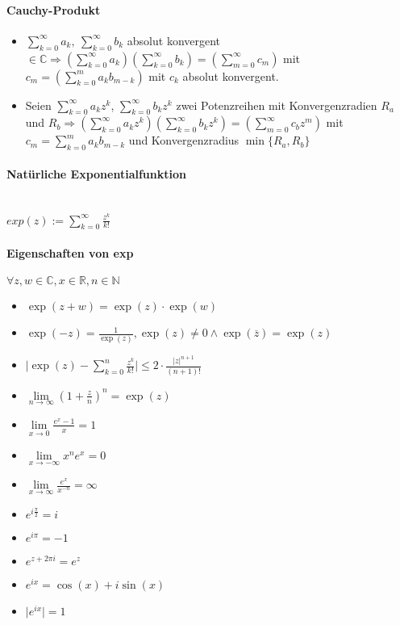 \documentclass[paper=a3,paper=landscape, fontsize=9pt, DIV=30]{scrartcl}
\newcommand{\real}{{\mathbb{R}}}
\newcommand{\compl}{\mathbb{C}}
\newcommand{\nat}{\mathbb{N}}
\begin{document}
\begin{multicols*}{4}
  \paragraph{Cauchy-Produkt}
  \begin{itemize}
  \item $ \sum_{k=0}^{\infty} a_k,\:\sum_{k=0}^{\infty} b_k$ absolut konvergent $ \in \compl \Rightarrow (\sum_{k=0}^{\infty} a_k) (\sum_{k=0}^{\infty} b_k) = (\sum_{m=0}^{\infty} c_m)$ mit $ c_m=(\sum_{k=0}^{m} a_kb_{m-k})$ mit $c_k$ absolut konvergent.

  \item Seien $ \sum_{k=0}^{\infty} a_kz^k$, $\sum_{k=0}^{\infty} b_kz^k$ zwei Potenzreihen mit Konvergenzradien $R_a$ und $ R_b \Rightarrow (\sum_{k=0}^{\infty} a_kz^k)(\sum_{k=0}^{\infty} b_kz^k)=(\sum_{m=0}^{\infty} c_bz^m)$ mit $ c_m = \sum_{k=0}^{m} a_kb_{m-k}$ und Konvergenzradius $\min\{R_a,R_b\}$
  \end{itemize}


  \paragraph{Natürliche Exponentialfunktion}\hspace{0pt} \\
  $ exp(z) := \sum_{k=0}^{\infty} \frac{z^k}{k!}$%


  \paragraph{Eigenschaften von exp}
  $\forall z,w \in \compl, x \in \real, n \in \nat$
  \begin{itemize}
  \item $\exp(z+w)=\exp(z)\cdot \exp(w)$
  \item $\exp(-z)=\frac{1}{\exp(z)}, \exp(z) \neq 0 \wedge \exp(\overline{z})=\exp(z)$
  \item $\lvert \exp(z)- \sum_{k=0}^{n} \frac{z^k}{k!} \rvert \leq 2 \cdot \frac{\lvert z \rvert ^{n+1}}{(n+1)!}$
  \item $\lim\limits_{n \rightarrow \infty} (1+\frac{z}{n})^n=\exp(z)$
  \item $\lim\limits_{x \rightarrow 0} \frac{e^x-1}{x} = 1$
  \item $\lim\limits_{x \rightarrow -\infty} x^ne^x=0$
  \item $\lim\limits_{x \rightarrow \infty} \frac{e^x}{x^{-n}}=\infty$
  \item $e^{i \frac{\pi}{2}} = i$
  \item $e^{i\pi}=-1$
  \item $e^{z+2\pi i}=e^z$
  \item $e^{ix}=\cos(x)+i\sin(x)$
  \item $\lvert e^{ix} \rvert = 1$
  \end{itemize}


\end{multicols*}
\end{document}
